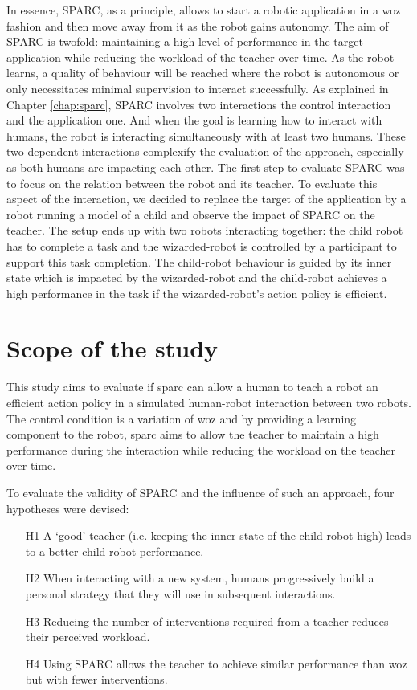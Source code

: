 In essence, SPARC, as a principle, allows to start a robotic application in a \gls{woz} fashion and then move away from it as the robot gains autonomy. The aim of SPARC is twofold: maintaining a high level of performance in the target application while reducing the workload of the teacher over time. As the robot learns, a quality of behaviour will be reached where the robot is autonomous or only necessitates minimal supervision to interact successfully. As explained in Chapter \ref{chap:sparc}, SPARC involves two interactions the control interaction and the application one. And when the goal is learning how to interact with humans, the robot is interacting simultaneously with at least two humans. These two dependent interactions complexify the evaluation of the approach, especially as both humans are impacting each other. The first step to evaluate SPARC was to focus on the relation between the robot and its teacher. To evaluate this aspect of the interaction, we decided to replace the target of the application by a robot running a model of a child and observe the impact of SPARC on the teacher. The setup ends up with two robots interacting together: the child robot has to complete a task and the wizarded-robot is controlled by a participant to support this task completion. The child-robot behaviour is guided by its inner state which is impacted by the wizarded-robot and the child-robot achieves a high performance in the task if the wizarded-robot's action policy is efficient.

\section{Scope of the study}

This study aims to evaluate if \gls{sparc} can allow a human to teach a robot an efficient action policy in a simulated human-robot interaction between two robots. The control condition is a variation of \gls{woz} and by providing a learning component to the robot, \gls{sparc} aims to allow the teacher to maintain a high performance during the interaction while reducing the workload on the teacher over time.

To evaluate the validity of SPARC and the influence of such an approach, four hypotheses were devised:
\begin{enumerate}
	\item [H1] A `good' teacher (i.e. keeping the inner state of the child-robot high) leads to a better child-robot performance.
	\item [H2] When interacting with a new system, humans progressively build a personal strategy that they will use in subsequent interactions.
	\item [H3] Reducing the number of interventions required from a teacher reduces their perceived workload.
	\item [H4] Using SPARC allows the teacher to achieve similar performance than \gls{woz} but with fewer interventions.
\end{enumerate}

